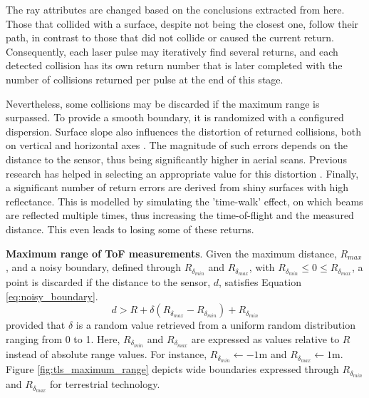 The ray attributes are changed based on the conclusions extracted from here. Those that collided with a surface, despite not being the closest one, follow their path, in contrast to those that did not collide or caused the current return. Consequently, each laser pulse may iteratively find several returns, and each detected collision has its own return number that is later completed with the number of collisions returned per pulse at the end of this stage. 
  
Nevertheless, some collisions may be discarded if the maximum range is surpassed. To provide a smooth boundary, it is randomized with a configured dispersion. Surface slope also influences the distortion of returned collisions, both on vertical and horizontal axes \cite{deems_lidar_2013}. The magnitude of such errors depends on the distance to the sensor, thus being significantly higher in aerial scans. Previous research has helped in selecting an appropriate value for this distortion \cite{hodgson_accuracy_2004}. Finally, a significant number of return errors are derived from shiny surfaces with high reflectance. This is modelled by simulating the 'time-walk' effect, on which beams are reflected multiple times, thus increasing the time-of-flight and the measured distance. This even leads to losing some of these returns. 

\textbf{Maximum range of ToF measurements}. Given the maximum distance, $R_{\textit{max}}$, and a noisy boundary, defined through $R_{\delta_{\textit{min}}}$ and $R_{\delta_{\textit{max}}}$, with $R_{\delta_{\textit{min}}} \leq 0 \leq R_{\delta_{\textit{max}}}$, a point is discarded if the distance to the sensor, $d$, satisfies Equation \ref{eq:noisy_boundary}.
\begin{equation}
    \label{eq:noisy_boundary}
    d > R + \delta (R_{\delta_{\textit{max}}} - R_{\delta_{\textit{min}}}) + R_{\delta_{\textit{min}}}
\end{equation}
provided that $\delta$ is a random value retrieved from a uniform random distribution ranging from 0 to 1. Here, $R_{\delta_{\textit{min}}}$ and $R_{\delta_{\textit{max}}}$ are expressed as values relative to $R$ instead of absolute range values. For instance, $R_{\delta_{\textit{min}}} \gets -1 \si{\meter}$ and $R_{\delta_{\textit{max}}} \gets 1 \si{\meter}$. Figure \ref{fig:tls_maximum_range} depicts wide boundaries expressed through $R_{\delta_{\textit{min}}}$ and $R_{\delta_{\textit{max}}}$ for terrestrial technology.

